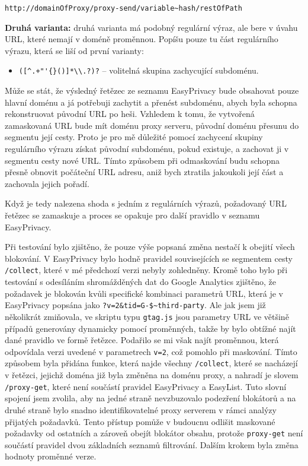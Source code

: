 \verb|http://domainOfProxy/proxy-send/variable~hash/restOfPath|


\textbf{Druhá varianta:} druhá varianta má podobný regulární výraz, ale bere v úvahu URL, které nemají v doméně proměnnou. Popíšu pouze tu část regulárního výrazu, která se liší od první varianty:
\begin{itemize}
    \item \verb|([^.+"'{}()]*\\.?)?| -- volitelná skupina zachycující subdoménu.
\end{itemize}

Může se stát, že výsledný řetězec ze seznamu EasyPrivacy bude obsahovat pouze hlavní doménu a já potřebuji zachytit a přenést subdoménu, abych byla schopna rekonstruovat původní URL po heši. Vzhledem k tomu, že vytvořená zamaskovaná URL bude mít doménu proxy serveru, původní doménu přesunu do segmentu její cesty. Proto je pro mě důležité pomocí zachycení skupiny regulárního výrazu získat původní subdoménu, pokud existuje, a zachovat ji v segmentu cesty nové URL. Tímto způsobem při odmaskování budu schopna přesně obnovit počáteční URL adresu, aniž bych ztratila jakoukoli její část a zachovala jejich pořadí.

Když je tedy nalezena shoda s jedním z regulárních výrazů, požadovaný URL řetězec se zamaskuje a proces se opakuje pro další pravidlo v seznamu EasyPrivacy.

Při testování bylo zjištěno, že pouze výše popsaná změna nestačí k obejití všech blokování. V EasyPrivacy bylo hodně pravidel souvisejících se segmentem cesty \texttt{/collect}, které v mé předchozí verzi nebyly zohledněny. Kromě toho bylo při testování s odesíláním shromážděných dat do Google Analytics zjištěno, že požadavek je blokován kvůli specifické kombinaci parametrů URL, která je v EasyPrivacy popsána jako \verb|?v=2&tid=G-$~third-party|. Ale jak jsem již několikrát zmiňovala, ve skriptu typu \texttt{gtag.js} jsou parametry URL ve většině případů generovány dynamicky pomocí proměnných, takže by bylo obtížné najít dané pravidlo ve formě řetězce. Podařilo se mi však najít proměnnou, která odpovídala verzi uvedené v parametrech \texttt{v=2}, což pomohlo při maskování. Tímto způsobem byla přidána funkce, která najde všechny \texttt{/collect}, které se nacházejí v řetězci, jejichž doména již byla změněna na doménu proxy, a nahradí je slovem \texttt{/proxy-get}, které není součástí pravidel EasyPrivacy a EasyList. Tuto slovní spojení jsem zvolila, aby na jedné straně nevzbuzovalo podezření blokátorů a na druhé straně bylo snadno identifikovatelné proxy serverem v rámci analýzy přijatých požadavků. Tento přístup pomůže v budoucnu odlišit maskované požadavky od ostatních a zároveň obejít blokátor obsahu, protože \texttt{proxy-get} není součástí pravidel dvou základních seznamů filtrování. Dalším krokem byla změna hodnoty proměnné verze. 

